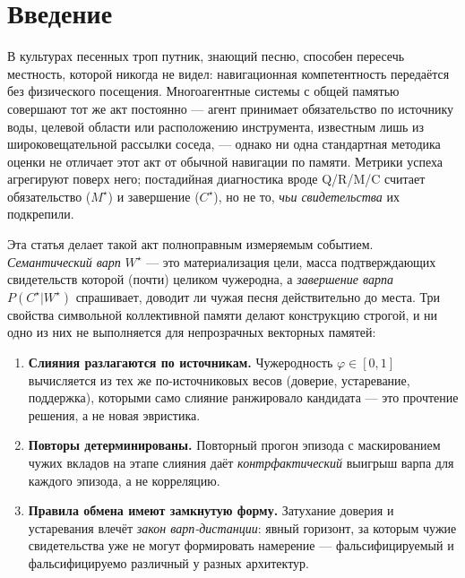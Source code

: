 \documentclass{article}
\newcommand{\wstar}{W^{\star}}
\newcommand{\mstar}{M^{\star}}
\newcommand{\cstar}{C^{\star}}
\begin{document}
\FloatBarrier
\section{Введение}
\label{p2:sec:intro}

В культурах песенных троп путник, знающий песню, способен пересечь
местность, которой никогда не видел: навигационная компетентность
передаётся без физического посещения. Многоагентные системы с общей
памятью совершают тот же акт постоянно --- агент принимает
обязательство по источнику воды, целевой области или расположению
инструмента, известным лишь из широковещательной рассылки соседа, ---
однако ни одна стандартная методика оценки не отличает этот акт от
обычной навигации по памяти. Метрики успеха агрегируют поверх него;
постадийная диагностика вроде Q/R/M/C считает обязательство
($\mstar$) и завершение ($\cstar$), но не то, \emph{чьи свидетельства}
их подкрепили.

Эта статья делает такой акт полноправным измеряемым событием.
\emph{Семантический варп} $\wstar$ --- это материализация цели, масса
подтверждающих свидетельств которой (почти) целиком чужеродна, а
\emph{завершение варпа} $P(\cstar|\wstar)$ спрашивает, доводит ли
чужая песня действительно до места. Три свойства символьной
коллективной памяти делают конструкцию строгой, и ни одно из них не
выполняется для непрозрачных векторных памятей:

\begin{enumerate}[leftmargin=20pt,itemsep=2pt,topsep=2pt]
\item \textbf{Слияния разлагаются по источникам.} Чужеродность
  $\varphi\in[0,1]$ вычисляется из тех же по-источниковых весов
  (доверие, устаревание, поддержка), которыми само слияние
  ранжировало кандидата --- это прочтение решения, а не новая
  эвристика.
\item \textbf{Повторы детерминированы.} Повторный прогон эпизода с
  маскированием чужих вкладов на этапе слияния даёт
  \emph{контрфактический} выигрыш варпа для каждого эпизода, а не
  корреляцию.
\item \textbf{Правила обмена имеют замкнутую форму.} Затухание
  доверия и устаревания влечёт \emph{закон варп-дистанции}: явный
  горизонт, за которым чужие свидетельства уже не могут формировать
  намерение --- фальсифицируемый и фальсифицируемо различный у разных
  архитектур.
\end{enumerate}
\end{document}
